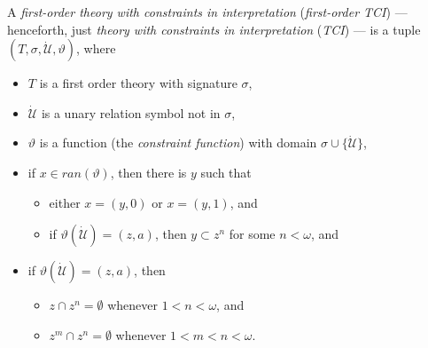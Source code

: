 \documentclass[12pt]{article}
\numberwithin{equation}{section}
\begin{document}
\begin{defi}
A \emph{first-order theory with constraints in interpretation} (\emph{first-order TCI}) --- henceforth, just \emph{theory with constraints in interpretation} (\emph{TCI}) --- is a tuple $(T, \sigma, \dot{\mathcal{U}}, \vartheta)$, where
\begin{itemize}
    \item $T$ is a first order theory with signature $\sigma$,
    \item $\dot{\mathcal{U}}$ is a unary relation symbol not in $\sigma$,
    \item $\vartheta$ is a function (the \emph{constraint function}) with domain $\sigma \cup \{\dot{\mathcal{U}}\}$, 
    \item if $x \in ran(\vartheta)$, then there is $y$ such that 
    \begin{itemize}[label=$\circ$]
        \item either $x = (y, 0)$ or $x = (y, 1)$, and
        \item if $\vartheta(\dot{\mathcal{U}}) = (z, a)$, then $y \subset z^n$ for some $n < \omega$, and
    \end{itemize}
    \item if $\vartheta(\dot{\mathcal{U}}) = (z, a)$, then 
    \begin{itemize}[label=$\circ$]
        \item $z \cap z^n = \emptyset$ whenever $1 < n < \omega$, and
        \item $z^m \cap z^n = \emptyset$ whenever $1 < m < n < \omega$.
    \end{itemize}
\end{itemize}
\end{defi}
\end{document}
